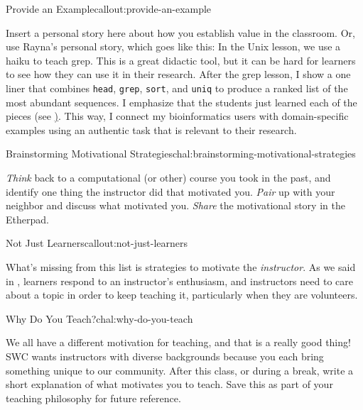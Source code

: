\begin{callout}{Provide an Example}{callout:provide-an-example}

Insert a personal story here about how you establish value in the
classroom. Or, use Rayna's personal story, which goes like this: In the
Unix lesson, we use a haiku to teach grep. This is a great didactic
tool, but it can be hard for learners to see how they can use it in
their research. After the grep lesson, I show a one liner that combines
\texttt{head}, \texttt{grep}, \texttt{sort}, and \texttt{uniq} to
produce a ranked list of the most abundant sequences. I emphasize that
the students just learned each of the pieces (see
\href{https://wikis.utexas.edu/display/bioiteam/Scott's list of linux one-liners}).
This way, I connect my bioinformatics users with domain-specific
examples using an authentic task that is relevant to their research.
\end{callout}

\begin{challenge}{Brainstorming Motivational Strategies}{chal:brainstorming-motivational-strategies}

\emph{Think} back to a computational (or other) course you took in the
past, and identify one thing the instructor did that motivated you.
\emph{Pair} up with your neighbor and discuss what motivated you.
\emph{Share} the motivational story in the Etherpad.
\end{challenge}

\begin{callout}{Not Just Learners}{callout:not-just-learners}

What's missing from this list is strategies to motivate the
\emph{instructor}. As we said in ,
learners respond to an instructor's enthusiasm, and instructors need to
care about a topic in order to keep teaching it, particularly when they
are volunteers.
\end{callout}

\begin{challenge}{Why Do You Teach?}{chal:why-do-you-teach}

We all have a different motivation for teaching, and that is a really
good thing! SWC wants instructors with diverse backgrounds because you
each bring something unique to our community. After this
class, or during a break, write a short explanation of what motivates
you to teach. Save this as part of your teaching philosophy for future
reference.
\end{challenge}

